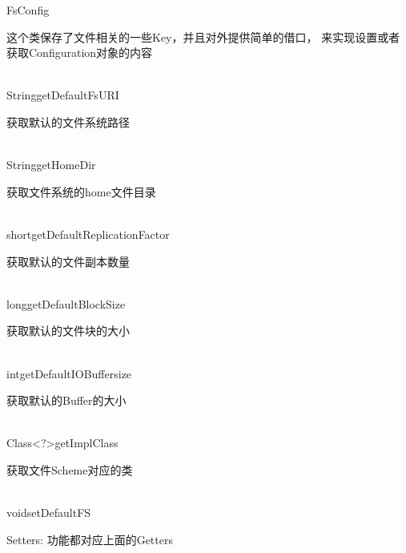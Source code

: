 \begin{XeClass}{FsConfig}
   
 这个类保存了文件相关的一些Key，并且对外提供简单的借口，
 来实现设置或者获取Configuration对象的内容

  \begin{XeMethod}{\XePublic\\ }{String}{getDefaultFsURI}
       
 获取默认的文件系统路径

  \end{XeMethod}

  \begin{XeMethod}{\XePublic\\ }{String}{getHomeDir}
       
 获取文件系统的home文件目录

  \end{XeMethod}

  \begin{XeMethod}{\XePublic\\ }{short}{getDefaultReplicationFactor}
       
 获取默认的文件副本数量

  \end{XeMethod}

  \begin{XeMethod}{\XePublic\\ }{long}{getDefaultBlockSize}
       
 获取默认的文件块的大小

  \end{XeMethod}

  \begin{XeMethod}{\XePublic\\ }{int}{getDefaultIOBuffersize}
       
 获取默认的Buffer的大小

  \end{XeMethod}

  \begin{XeMethod}{\XePublic\\ }{Class<?>}{getImplClass}
       
 获取文件Scheme对应的类

  \end{XeMethod}

  \begin{XeMethod}{\XePublic\\ }{void}{setDefaultFS}
       
 Setters: 功能都对应上面的Getters

  \end{XeMethod}

\end{XeClass}
